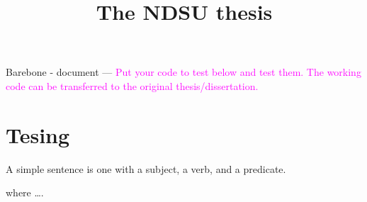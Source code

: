 \documentclass[12pt,mathdesign,showframe]{ndsu-thesis-2022}
\title{\vspace{-8pt}The NDSU thesis}
\begin{document}
Barebone - document --- \textcolor{magenta}{Put your code to test below and test them. The working code can be transferred to the original thesis/dissertation.}

\section{Tesing}

A simple sentence is one with a subject, a verb, and a predicate. 


\noindent where \ldots.
\end{document}
